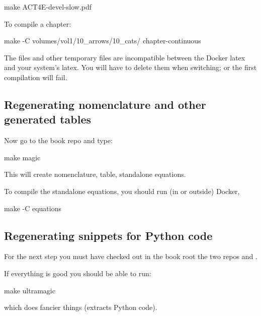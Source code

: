 \begin{console}
    make ACT4E-devel-slow.pdf
\end{console}

To compile a chapter:

\begin{console}
    make -C volumes/vol1/10_arrows/10_cats/ chapter-continuous
\end{console}

\begin{remark}
    The  files and other temporary files are incompatible between the Docker latex and your system's latex.
    You will have to delete them when switching; or the first compilation will fail.
\end{remark}

\subsection{Regenerating nomenclature and other generated tables}


Now go to the book repo and type:

\begin{console}
    make magic
\end{console}

This will create nomenclature, table, standalone equations.

To compile the standalone equations, you should run (in or outside) Docker,

\begin{console}
    make -C equations
\end{console}

\subsection{Regenerating snippets for Python code}


For the next step you must have checked out in the book root the two repos
 and .


If everything is good you should be able to run:
\begin{console}
    make ultramagic
\end{console}
which does fancier things (extracts Python code).


%
%
%
%
%
%


